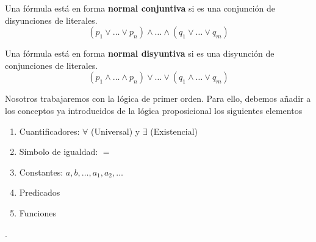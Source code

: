 \begin{Def}
  Una fórmula está en forma \textbf{normal conjuntiva} si es una conjunción de
  disyunciones de literales.
  $$(p_1\vee \dots \vee p_n)\wedge \dots \wedge (q_1\vee \dots \vee q_m)$$
\end{Def}

\begin{Def}
  Una fórmula está en forma \textbf{normal disyuntiva} si es una disyunción de
  conjunciones de literales.
  $$(p_1 \wedge \dots \wedge p_n)\vee \dots \vee (q_1\wedge \dots \vee q_m)$$
\end{Def}

Nosotros trabajaremos con la lógica de primer orden. Para ello, debemos añadir
a los conceptos ya introducidos de la lógica proposicional los siguientes
elementos
\begin{enumerate}
\item Cuantificadores: $\forall$ (Universal) y $\exists$ (Existencial)
\item Símbolo de igualdad: $=$
\item Constantes: $a,b,\dots,a_1,a_2,\dots$
\item Predicados
\item Funciones
\end{enumerate}
.

